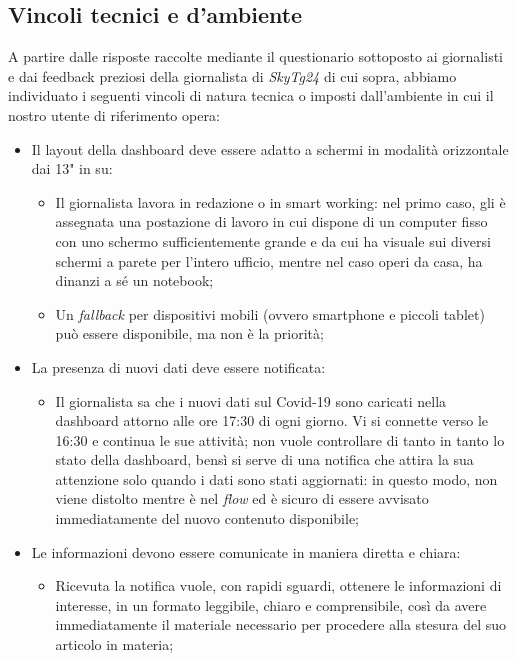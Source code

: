 \subsection{Vincoli tecnici e d'ambiente}
A partire dalle risposte raccolte mediante il questionario sottoposto ai giornalisti e dai feedback preziosi della giornalista di \emph{SkyTg24} di cui sopra, abbiamo individuato i seguenti vincoli di natura tecnica o imposti dall'ambiente in cui il nostro utente di riferimento opera:
\begin{itemize}
    \item Il layout della dashboard deve essere adatto a schermi in modalità orizzontale dai 13" in su:
    \begin{itemize}
        \item Il giornalista lavora in redazione o in smart working: nel primo caso, gli è assegnata una postazione di lavoro in cui dispone di un computer fisso con uno schermo sufficientemente grande e da cui ha visuale sui diversi schermi a parete per l'intero ufficio, mentre nel caso operi da casa, ha dinanzi a sé un notebook; 
        \item Un \textit{fallback} per dispositivi mobili (ovvero smartphone e piccoli tablet) può essere disponibile, ma non è la priorità;
    \end{itemize}
    \item La presenza di nuovi dati deve essere notificata:
    \begin{itemize}
        \item Il giornalista sa che i nuovi dati sul Covid-19 sono caricati nella dashboard attorno alle ore 17:30 di ogni giorno. Vi si connette verso le 16:30 e continua le sue attività; non vuole controllare di tanto in tanto lo stato della dashboard, bensì si serve di una notifica che attira la sua attenzione solo quando i dati sono stati aggiornati: in questo modo, non viene distolto mentre è nel \textit{flow} ed è sicuro di essere avvisato immediatamente del nuovo contenuto disponibile;
    \end{itemize}
	\item Le informazioni devono essere comunicate in maniera diretta e chiara:
	\begin{itemize}
        \item Ricevuta la notifica vuole, con rapidi sguardi, ottenere le informazioni di interesse, in un formato leggibile, chiaro e comprensibile, così da avere immediatamente il materiale necessario per procedere alla stesura del suo articolo in materia;
    \end{itemize}

\end{itemize}
